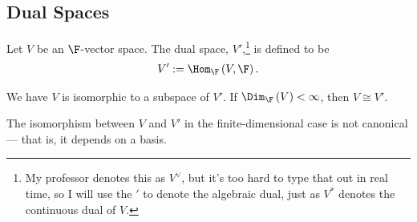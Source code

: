 \documentclass[10pt]{mypackage}
\begin{document}
\subsection{Dual Spaces}%
\begin{definition}
  Let $V$ be an $\F$-vector space. The dual space, $V'$,\footnote{My professor denotes this as $V^{\vee}$, but it's too hard to type that out in real time, so I will use the $'$ to denote the algebraic dual, just as $V^{\ast}$ denotes the continuous dual of $V$.} is defined to be
  \begin{align*}
    V':= \Hom_{\F}\left(V,\F\right).
  \end{align*}
\end{definition}
\begin{theorem}
  We have $V$ is isomorphic to a subspace of $V'$. If $\Dim_{\F}\left(V\right) < \infty$, then $V\cong V'$.
\end{theorem}
\begin{remark}
  The isomorphism between $V$ and $V'$ in the finite-dimensional case is not canonical --- that is, it depends on a basis.
\end{remark}
\end{document}
